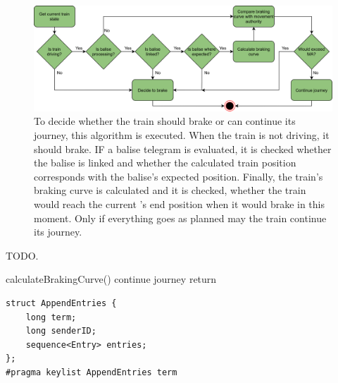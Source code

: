 \begin{figure}[!hb]
	\centering
	\includegraphics[width=0.75\linewidth]{images/DecisionMaking}
	\caption{To decide whether the train should brake or can continue its journey, this algorithm is executed. When the train is not driving, it should brake. IF a balise telegram is evaluated, it is checked whether the balise is linked and whether the calculated train position corresponds with the balise's expected position. Finally, the train's braking curve is calculated and it is checked, whether the train would reach the current 's end position when it would brake in this moment. Only if everything goes as planned may the train continue its journey.}
	\label{fig:DecisionMaking}
\end{figure}

\begin{algorithm}[H]\caption{TODO.}\label{algo:DecisionMaking}

\BlankLine

calculateBrakingCurve()\;
continue journey\;
return\;
\end{algorithm}





\lstset{language=C}
\begin{lstlisting}[caption={\abr{IDL} definition for the \texttt{AppendEntries} topic. The \texttt{term} variable represents the latest term that the replica has seen, while the \texttt{senderID} encodes which replica sent this message. With \texttt{entries}, a payload can be send via the topic. This is used by a leader for instructing its followers to process certain data. The \texttt{entries} field is left empty for heartbeat messages.}, label=code:appendEntries]
struct AppendEntries {
    long term;
    long senderID;
    sequence<Entry> entries;
};
#pragma keylist AppendEntries term
\end{lstlisting}

